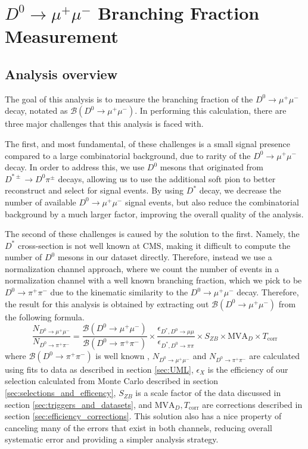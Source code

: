 \chapter{$D^0 \to \mu^+\mu^-$ Branching Fraction Measurement}
\label{ch:4}

\section{Analysis overview}

\label{sec:analysis_overview}

The goal of this analysis is to measure the branching fraction of the $D^0 \to \mu^+ \mu^-$ decay, notated as $\mathcal{B}(D^0 \to \mu^+ \mu^-)$. In performing this calculation, there are three major challenges that this analysis is faced with. 

The first, and most fundamental, of these challenges is a small signal presence compared to a large combinatorial background, due to rarity of the $D^0 \to \mu^+ \mu^-$ decay. In order to address this, we use $D^0$ mesons that originated from $D^{*\pm} \to D^0 \pi^\pm$ decays, allowing us to use the additional soft pion to better reconstruct and select for signal events. By using $D^*$ decay, we decrease the number of available $D^0 \to \mu^+ \mu^-$ signal events, but also reduce the combinatorial background by a much larger factor, improving the overall quality of the analysis. 

The second of these challenges is caused by the solution to the first. Namely, the $D^*$ cross-section is not well known at CMS, making it difficult to compute the number of $D^0$ mesons in our dataset directly. Therefore, instead we use a normalization channel approach, where we count the number of events in a normalization channel with a well known branching fraction, which we pick to be $D^0 \to \pi^+ \pi^-$ due to the kinematic similarity to the $D^0 \to \mu^+ \mu^-$ decay. Therefore, the result for this analysis is obtained by extracting out $\mathcal{B}(D^0 \to \mu^+ \mu^-)$ from the following formula.
\begin{equation}
    \frac{N_{D^0 \to \mu^+  \mu^-}}{N_{D^0 \to \pi^+ \pi^-}} = \frac{\mathcal{B}(D^0 \to \mu^+ \mu^-)}{\mathcal{B}(D^0 \to \pi^+ \pi^-)}\times \frac{\epsilon_{D^*, D^0\to\mu\mu}}{\epsilon_{D^*, D^0\to\pi\pi}} \times S_{ZB} \times \text{MVA}_D \times T_{\text{corr}} 
\label{eq:main_analysis}
\end{equation}
where $\mathcal{B}(D^0 \to \pi^+ \pi^-)$ is well known \cite{ref:pdg2024}, $N_{D^0 \to \mu^+  \mu^-}$ and $N_{D^0 \to \pi^+ \pi^-}$ are calculated using fits to data as described in section \ref{sec:UML}, $\epsilon_X$ is the efficiency of our selection calculated from Monte Carlo described in section \ref{sec:selections_and_efficency}, $S_{ZB}$ is a scale factor of the data discussed in section \ref{sec:triggers_and_datasets}, and $\text{MVA}_D,T_{\text{corr}}$ are corrections described in section \ref{sec:efficiency_corrections}. This solution also has a nice property of canceling many of the errors that exist in both channels, reducing overall systematic error and providing a simpler analysis strategy.

